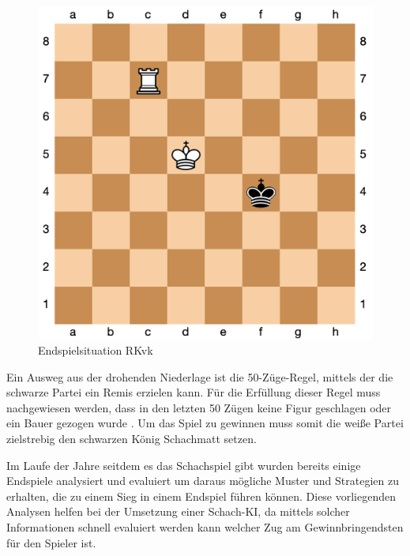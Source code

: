 \begin{figure}[h]
\centering
\includegraphics[width=\textwidth/5*4]{images/RKvk.png}

\caption{Endspielsituation RKvk}\label{fig:RKvk}
\end{figure}

Ein Ausweg aus der drohenden Niederlage ist die 50-Züge-Regel, mittels der die schwarze Partei ein Remis erzielen kann. Für die Erfüllung dieser Regel muss nachgewiesen werden, dass in den letzten 50 Zügen keine Figur geschlagen oder ein Bauer gezogen wurde \cite{Alt2018}. Um das Spiel zu gewinnen muss somit die weiße Partei zielstrebig den schwarzen König Schachmatt setzen.


Im Laufe der Jahre seitdem es das Schachspiel gibt wurden bereits einige Endspiele analysiert und evaluiert um daraus mögliche Muster und Strategien zu erhalten, die zu einem Sieg in einem Endspiel führen können. Diese vorliegenden Analysen helfen bei der Umsetzung einer Schach-KI, da mittels solcher Informationen schnell evaluiert werden kann welcher Zug am Gewinnbringendsten für den Spieler ist. 

